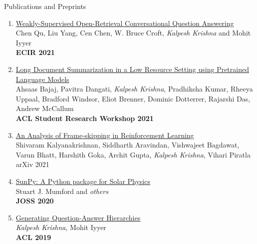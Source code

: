 \documentclass{resume} %
\begin{document}
\begin{rSection}{Publications and Preprints}
\begin{enumerate}[leftmargin=*]
\item \href{https://arxiv.org/abs/2103.02537}{Weakly-Supervised Open-Retrieval Conversational Question Answering} \\
Chen Qu, Liu Yang, Cen Chen, W. Bruce Croft, \textit{Kalpesh Krishna} and Mohit Iyyer \\
\textbf{ECIR 2021}
\item \href{https://arxiv.org/abs/2103.00751}{Long Document Summarization in a Low Resource Setting using Pretrained Language Models} \\ Ahsaas Bajaj, Pavitra Dangati, \textit{Kalpesh Krishna}, Pradhiksha Kumar, Rheeya Uppaal, Bradford Windsor, Eliot Brenner, Dominic Dotterrer, Rajarshi Das, Andrew McCallum \\
\textbf{ACL Student Research Workshop 2021}
\item \href{https://arxiv.org/abs/2102.03718}{An Analysis of Frame-skipping in Reinforcement Learning} \\ Shivaram Kalyanakrishnan, Siddharth Aravindan, Vishwajeet Bagdawat, Varun Bhatt, Harshith Goka, Archit Gupta, \textit{Kalpesh Krishna}, Vihari Piratla \\
arXiv 2021

\item \href{https://joss.theoj.org/papers/10.21105/joss.01832}{SunPy: A Python package for Solar Physics} \\ Stuart J. Mumford and \textit{others} \\ \textbf{JOSS 2020}

\item \href{https://arxiv.org/abs/1906.02622}{Generating Question-Answer Hierarchies} \\ \textit{Kalpesh Krishna}, Mohit Iyyer \\ \textbf{ACL 2019}


\end{enumerate}
\end{rSection}
\end{document}

